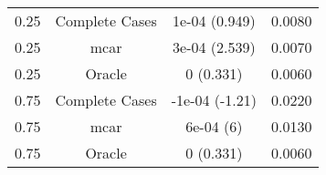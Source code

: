 \begin{table}[ht]
\centering
\begin{tabular}{cccc}
  \hline
  \hline
0.25 & Complete Cases & 1e-04 (0.949) & 0.0080 \\ 
  0.25 & mcar & 3e-04 (2.539) & 0.0070 \\ 
  0.25 & Oracle & 0 (0.331) & 0.0060 \\ 
  0.75 & Complete Cases & -1e-04 (-1.21) & 0.0220 \\ 
  0.75 & mcar & 6e-04 (6) & 0.0130 \\ 
  0.75 & Oracle & 0 (0.331) & 0.0060 \\ 
   \hline
\end{tabular}
\end{table}
